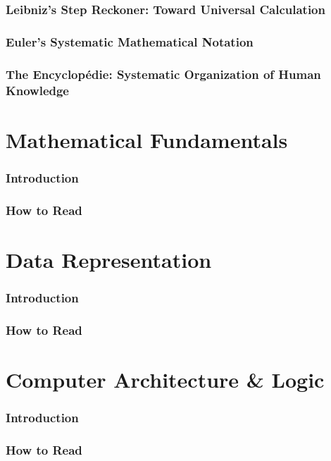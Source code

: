 \documentclass[12pt, oneside, openany]{book}
\begin{document}
\section{Leibniz's Step Reckoner: Toward Universal Calculation}

\section{Euler's Systematic Mathematical Notation}

\section{The Encyclopédie: Systematic Organization of Human Knowledge}

\part{Mathematical Fundamentals}
\section*{Introduction}
\section*{How to Read}
\part{Data Representation}
\section*{Introduction}
\section*{How to Read}
\part{Computer Architecture \& Logic}
\section*{Introduction}
\section*{How to Read}
\end{document}

